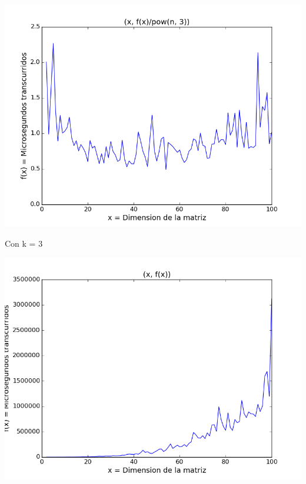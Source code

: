 \begin{center}
\includegraphics[scale=0.54]{images/2potenciasobrecubo}
\end{center}


\vspace{2mm}

Con k = 3


\begin{center}
\includegraphics[scale=0.54]{images/3potenciafuncion}
\end{center}


